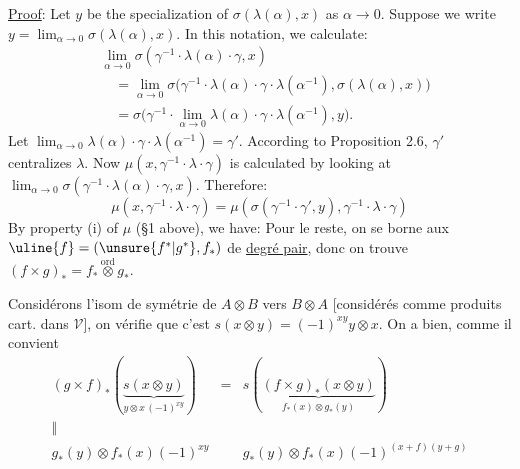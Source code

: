 \uline{Proof}: Let $y$ be the specialization of $\sigma(\lambda(\alpha),x)$ as $\alpha\longrightarrow0$. Suppose we write $y=\lim_{\alpha\to0}\sigma(\lambda(\alpha),x)$. In this notation, we calculate:
\[
\begin{aligned}
&\lim_{\alpha\to0}\sigma(\gamma^{-1}\cdot\lambda(\alpha)\cdot\gamma,x)\\
&\quad=\lim_{\alpha\to0}\sigma\bigl(\gamma^{-1}\cdot\lambda(\alpha)\cdot\gamma\cdot\lambda(\alpha^{-1}),\sigma(\lambda(\alpha),x)\bigr)\\
&\quad=\sigma\bigl(\gamma^{-1}\cdot\lim_{\alpha\to0}\lambda(\alpha)\cdot\gamma\cdot\lambda(\alpha^{-1}),y\bigr).
\end{aligned}
\]
Let $\lim_{\alpha\to0}\lambda(\alpha)\cdot\gamma\cdot\lambda(\alpha^{-1})=\gamma'$. According to Proposition 2.6, $\gamma'$ centralizes $\lambda$. Now $\mu(x,\gamma^{-1}\cdot\lambda\cdot\gamma)$ is calculated by looking at $\lim_{\alpha\to0}\sigma(\gamma^{-1}\cdot\lambda(\alpha)\cdot\gamma,x)$. Therefore:
\[
\mu(x,\gamma^{-1}\cdot\lambda\cdot\gamma)
=\mu(\sigma(\gamma^{-1}\cdot\gamma',y),\gamma^{-1}\cdot\lambda\cdot\gamma)
\]
By property (i) of $\mu$ (\S1 above), we have:
Pour le reste, on se borne aux $\uline{f}=(\unsure{f^*|g^*},f_*)$ de \uline{degré pair}, donc on trouve $(f\times g)_*=f_*\overset{\mathrm{ord}}\otimes g_*$.

Considérons l'isom de symétrie de $A\otimes B$ vers $B\otimes A$ [considérés comme produits cart. dans $\mathcal V$], on vérifie que c'est $s(x\otimes y)=(-1)^{xy}y\otimes x$. On a bien, comme il convient
\[
\begin{array}{ccc}
(g\times f)_*(\underbrace{s(x\otimes y)}_{y\otimes x\,(-1)^{xy}})
&=&s(\underbrace{(f\times g)_*(x\otimes y)}_{f_*(x)\otimes g_*(y)})\\
\Vert&&\\
g_*(y)\otimes f_*(x)(-1)^{xy}&&g_*(y)\otimes f_*(x)(-1)^{(x+f)(y+g)}
\end{array}
\]

